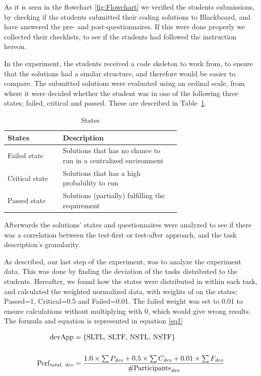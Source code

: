 \documentclass{sig-alternate-05-2015}
\begin{document}
As it is seen in the flowchart \ref{fig:Flowchart} we verified the students submissions, by checking if the students submitted their coding solutions to Blackboard, and have answered the pre- and post-questionnaires. If this were done properly we collected their checklists, to see if the students had followed the instruction hereon.

In the experiment, the students received a code skeleton to work from, to ensure that the solutions had a similar structure, and therefore would be easier to compare. The submitted solutions were evaluated using an ordinal scale, from where it were decided whether the student was in one of the following three states; failed, critical and passed. These are described in Table~\ref{StatesTable}.

\begin{table}[!ht]
\centering
\caption{States}
\label{StatesTable}
\begin{tabular}{|l|p{0.68\linewidth}|}
\hline
\textbf{States} & \textbf{Description} \\
\hline
\hline
Failed state & Solutions that has no chance to run in a centralized environment \\
Critical state & Solutions that has a high probability to run \\
Passed state & Solutions (partially) fulfilling the requirement \\
\hline
\end{tabular}
\end{table}

Afterwards the solutions' states and questionnaires were analyzed to see if there was a correlation between the test-first or test-after approach, and the task description's granularity.

As described, our last step of the experiment, was to ana\-lyze the experiment data. This was done by finding the deviation of the tasks distributed to the students. Hereafter, we found how the states were distributed in within each task, and calculated the weighted normalized data, with weights of on the states; Passed=1, Critical=0.5 and Failed=0.01. The failed weight was set to 0.01 to ensure calculations without multiplying with 0, which would give wrong results.
The formula and equation is represented in equation \ref{eq1}

\begin{equation} \label{eq1}
\begin{split}
\text{devApp} &= \{\text{SLTL, SLTF, NSTL, NSTF}\} \\
& \\
\text{Perf}_{\emph{total, dev}} &= \dfrac{1.0\times \sum{P_{\emph{dev}}}+0.5\times \sum {C_{\emph{dev}}}+0.01\times \sum{ F_{\emph{dev}}}}{\# \text{Participants}_{\emph{dev}}}
\end{split}
\end{equation}
\end{document}
